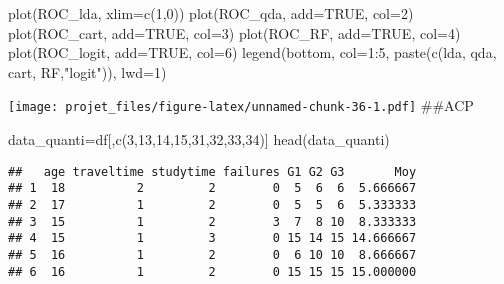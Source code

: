 \documentclass[
]{article}
\newenvironment{Shaded}{\begin{snugshade}}{\end{snugshade}}
\newcommand{\AttributeTok}[1]{\textcolor[rgb]{0.77,0.63,0.00}{#1}}
\newcommand{\ConstantTok}[1]{\textcolor[rgb]{0.00,0.00,0.00}{#1}}
\newcommand{\DecValTok}[1]{\textcolor[rgb]{0.00,0.00,0.81}{#1}}
\newcommand{\FunctionTok}[1]{\textcolor[rgb]{0.00,0.00,0.00}{#1}}
\newcommand{\NormalTok}[1]{#1}
\newcommand{\OtherTok}[1]{\textcolor[rgb]{0.56,0.35,0.01}{#1}}
\newcommand{\SpecialCharTok}[1]{\textcolor[rgb]{0.00,0.00,0.00}{#1}}
\newcommand{\StringTok}[1]{\textcolor[rgb]{0.31,0.60,0.02}{#1}}
\begin{document}
\begin{Shaded}
\begin{Highlighting}[]
\FunctionTok{plot}\NormalTok{(ROC\_lda, }\AttributeTok{xlim=}\FunctionTok{c}\NormalTok{(}\DecValTok{1}\NormalTok{,}\DecValTok{0}\NormalTok{))}
\FunctionTok{plot}\NormalTok{(ROC\_qda, }\AttributeTok{add=}\ConstantTok{TRUE}\NormalTok{, }\AttributeTok{col=}\DecValTok{2}\NormalTok{)}
\FunctionTok{plot}\NormalTok{(ROC\_cart, }\AttributeTok{add=}\ConstantTok{TRUE}\NormalTok{, }\AttributeTok{col=}\DecValTok{3}\NormalTok{)}
\FunctionTok{plot}\NormalTok{(ROC\_RF, }\AttributeTok{add=}\ConstantTok{TRUE}\NormalTok{, }\AttributeTok{col=}\DecValTok{4}\NormalTok{)}
\FunctionTok{plot}\NormalTok{(ROC\_logit, }\AttributeTok{add=}\ConstantTok{TRUE}\NormalTok{, }\AttributeTok{col=}\DecValTok{6}\NormalTok{)}
\FunctionTok{legend}\NormalTok{(}\StringTok{\textquotesingle{}bottom\textquotesingle{}}\NormalTok{, }\AttributeTok{col=}\DecValTok{1}\SpecialCharTok{:}\DecValTok{5}\NormalTok{, }\FunctionTok{paste}\NormalTok{(}\FunctionTok{c}\NormalTok{(}\StringTok{\textquotesingle{}lda\textquotesingle{}}\NormalTok{, }\StringTok{\textquotesingle{}qda\textquotesingle{}}\NormalTok{, }\StringTok{\textquotesingle{}cart\textquotesingle{}}\NormalTok{, }\StringTok{\textquotesingle{}RF\textquotesingle{}}\NormalTok{,}\StringTok{"logit"}\NormalTok{)),  }\AttributeTok{lwd=}\DecValTok{1}\NormalTok{)}
\end{Highlighting}
\end{Shaded}

\texttt{[image: projet\_files/figure-latex/unnamed-chunk-36-1.pdf]}
\#\#ACP

\begin{Shaded}
\begin{Highlighting}[]
\NormalTok{data\_quanti}\OtherTok{=}\NormalTok{df[,}\FunctionTok{c}\NormalTok{(}\DecValTok{3}\NormalTok{,}\DecValTok{13}\NormalTok{,}\DecValTok{14}\NormalTok{,}\DecValTok{15}\NormalTok{,}\DecValTok{31}\NormalTok{,}\DecValTok{32}\NormalTok{,}\DecValTok{33}\NormalTok{,}\DecValTok{34}\NormalTok{)]}
\FunctionTok{head}\NormalTok{(data\_quanti)}
\end{Highlighting}
\end{Shaded}

\begin{verbatim}
##   age traveltime studytime failures G1 G2 G3       Moy
## 1  18          2         2        0  5  6  6  5.666667
## 2  17          1         2        0  5  5  6  5.333333
## 3  15          1         2        3  7  8 10  8.333333
## 4  15          1         3        0 15 14 15 14.666667
## 5  16          1         2        0  6 10 10  8.666667
## 6  16          1         2        0 15 15 15 15.000000
\end{verbatim}
\end{document}
